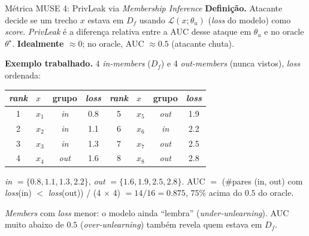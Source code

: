 \documentclass[aspectratio=169,xcolor=dvipsnames]{beamer}
\begin{document}
  \begin{frame}{Métrica MUSE 4: PrivLeak via \textit{Membership Inference}}
    \textbf{Definição.} Atacante decide se um trecho $x$ estava em $D_f$ usando $\mathcal{L}(x;\theta_u)$ (\textit{loss} do modelo) como \textit{score}. \textit{PrivLeak} é a diferença relativa entre a AUC desse ataque em $\theta_u$ e no oracle $\theta^\star$. \textbf{Idealmente $\approx 0$}; no oracle, AUC $\approx 0.5$ (atacante chuta).

    \vspace{0.3em}
    \textbf{Exemplo trabalhado.} 4 \textit{in-members} ($D_f$) e 4 \textit{out-members} (nunca vistos), \textit{loss} ordenada:

    \centering
    \footnotesize
    \begin{tabular}{@{}clccclcc@{}}
      \toprule
      \textit{rank} & $x$ & grupo & \textit{loss} & \textit{rank} & $x$ & grupo & \textit{loss} \\
      \midrule
      1 & $x_1$ & \textit{in} & 0.8 & 5 & $x_5$ & \textit{out} & 1.9 \\
      2 & $x_2$ & \textit{in} & 1.1 & 6 & $x_6$ & \textit{in} & 2.2 \\
      3 & $x_3$ & \textit{in} & 1.3 & 7 & $x_7$ & \textit{out} & 2.5 \\
      4 & $x_4$ & \textit{out} & 1.6 & 8 & $x_8$ & \textit{out} & 2.8 \\
      \bottomrule
    \end{tabular}

    \vspace{0.3em}
    \textit{in} $= \{0.8, 1.1, 1.3, 2.2\}$, \textit{out} $= \{1.6, 1.9, 2.5, 2.8\}$. AUC $=$ (\#pares (in, out) com \textit{loss}(in) $<$ \textit{loss}(out)) / (4 $\times$ 4) $= 14 / 16 = \mathbf{0.875}$, $75\%$ acima do $0.5$ do oracle.

    \vspace{0.2em}
    \footnotesize \textit{Members} com \textit{loss} menor: o modelo ainda ``lembra'' (\textit{under-unlearning}). AUC muito abaixo de $0.5$ (\textit{over-unlearning}) também revela quem estava em $D_f$.
  \end{frame}
\end{document}
